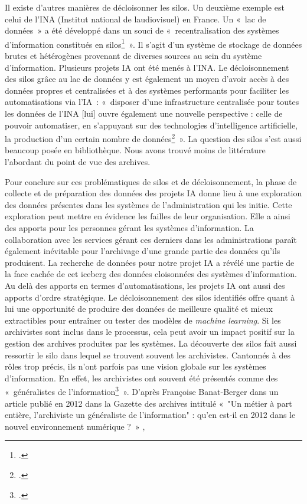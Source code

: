 Il existe d'autres manières de décloisonner les silos. Un deuxième
exemple est celui de l'INA (Institut national de
l\textquotesingle audiovisuel) en France. Un «~lac de données~» a été
développé dans un souci de «~recentralisation des systèmes d'information
constitués en silos\footcite{poupeau__2024}~».
Il s'agit d'un système de stockage de données brutes et hétérogènes
provenant de diverses sources au sein du système d'information. Plusieurs projets IA ont été menés à l'INA. Le décloisonnement des silos
grâce au lac de données y est également un moyen d'avoir accès à des
données propres et centralisées et à des systèmes performants pour
faciliter les automatisations via l'IA~: «~disposer d'une
infrastructure centralisée pour toutes les données de l'INA {[}lui{]}
ouvre également une nouvelle perspective : celle de pouvoir automatiser,
en s'appuyant sur des technologies d'intelligence artificielle, la
production d'un certain nombre de données\footcite{poupeau__2024}~».
La question des silos s'est aussi beaucoup posée en bibliothèque. Nous avons trouvé moins de littérature
l'abordant du point de vue des archives.
\newline

Pour conclure sur ces problématiques de silos et de
décloisonnement, la phase de collecte et de préparation des données des
projets IA donne lieu à une exploration des données présentes dans les
systèmes de l'administration qui les initie. Cette exploration peut mettre
en évidence les failles de leur organisation. Elle a ainsi des apports
pour les personnes gérant les systèmes d'information. La collaboration
avec les services gérant ces derniers dans les administrations
paraît également inévitable pour l'archivage d'une grande partie des
données qu'ils produisent. La recherche de données pour notre projet IA
a révélé une partie de la face cachée de cet iceberg des données
cloisonnées des systèmes d'information. Au delà des apports en termes
d'automatisations, les projets IA ont aussi des apports d'ordre
stratégique. Le décloisonnement des silos identifiés offre quant à lui
une opportunité de produire des données de meilleure qualité et mieux
extractibles pour entraîner ou tester des modèles de \emph{machine
	learning}. Si les archivistes sont inclus dans le processus, cela peut
avoir un impact positif sur la gestion des archives produites par les
systèmes. La découverte des silos fait aussi ressortir le silo dans
lequel se trouvent souvent les archivistes. Cantonnés à des rôles trop
précis, ils n'ont parfois pas une vision globale sur les systèmes
d'information. En effet, les archivistes ont souvent été présentés comme
des «~généralistes de l'information\footcite{banat-berger__2012}~».
D'après Françoise Banat-Berger dans un article publié en 2012 dans la
Gazette des archives intitulé «~"Un métier à part entière, l'archiviste
un généraliste de l'information" : qu'en est-il en 2012 dans le nouvel
environnement numérique ?~» , 

